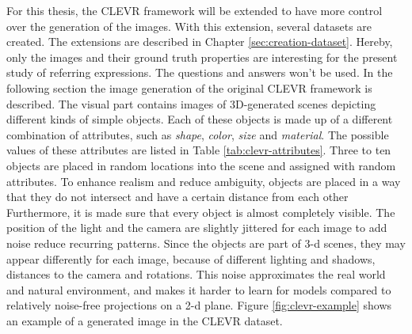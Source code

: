 For this thesis, the CLEVR framework will be extended to have more control over the generation of the images.
With this extension, several datasets are created.
The extensions are described in Chapter \ref{sec:creation-dataset}.
Hereby, only the images and their ground truth properties are interesting for the present study of referring expressions.
The questions and answers won't be used.
In the following section the image generation of the original CLEVR framework is described.
The visual part contains images of 3D-generated scenes depicting different kinds of simple objects.
Each of these objects is made up of a different combination of attributes, such as \emph{shape}, \emph{color}, \emph{size} and \emph{material}.
The possible values of these attributes are listed in Table \ref{tab:clevr-attributes}.
Three to ten objects are placed in random locations into the scene and assigned with random attributes.
To enhance realism and reduce ambiguity, objects are placed in a way that they do not intersect and have a certain distance from each other
Furthermore, it is made sure that every object is almost completely visible.
The position of the light and the camera are slightly jittered for each image to add noise reduce recurring patterns.
Since the objects are part of 3-d scenes, they may appear differently for each image, because of different lighting and shadows, distances to the camera and rotations.
This noise approximates the real world and natural environment, and makes it harder to learn for models compared to relatively noise-free projections on a 2-d plane.
Figure \ref{fig:clevr-example} shows an example of a generated image in the CLEVR dataset.

